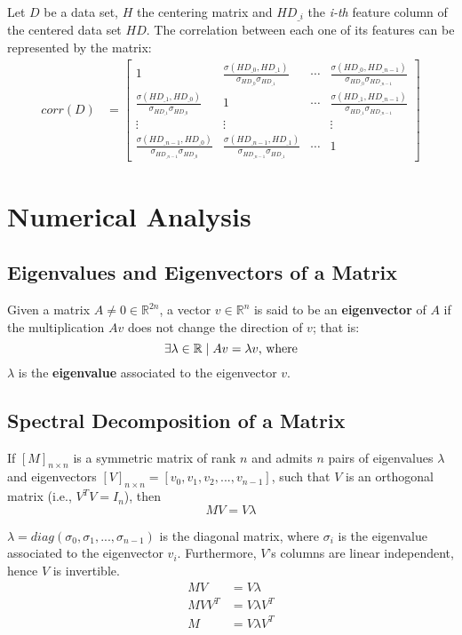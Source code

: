 Let $D$ be a data set, $H$ the centering matrix and $HD_{\_i}$ the {\em i-th} feature column of the centered data set $HD$. The correlation between each one of its features can be represented by the matrix:
\begin{align*}
	corr(D) &= \begin{bmatrix}
		1 & \frac{\sigma(HD_{\_0}, HD_{\_1})}{\sigma_{HD_{\_0}} \sigma_{HD_{\_1}}} & \cdots & \frac{\sigma(HD_{\_0}, HD_{\_n-1})}{\sigma_{HD_{\_0}} \sigma_{HD_{\_n-1}}} \\
		\frac{\sigma(HD_{\_1}, HD_{\_0})}{\sigma_{HD_{\_1}} \sigma_{HD_{\_0}}} & 1 & \cdots & \frac{\sigma(HD_{\_1}, HD_{\_n-1})}{\sigma_{HD_{\_1}} \sigma_{HD_{\_n-1}}} \\
		\vdots & \vdots && \vdots \\
		\frac{\sigma(HD_{\_n-1}, HD_{\_0})}{\sigma_{HD_{\_n-1}} \sigma_{HD_{\_0}}} & \frac{\sigma(HD_{\_n-1}, HD_{\_1})}{\sigma_{HD_{\_n-1}} \sigma_{HD_{\_1}}} & \cdots & 1
	\end{bmatrix}
\end{align*}

\section{Numerical Analysis}
\subsection{Eigenvalues and Eigenvectors of a Matrix}

Given a matrix $A \ne 0 \in \mathbb{R}^{2n}$, a vector $v \in \mathbb{R}^n$ is said to be an \textbf{eigenvector} of $A$ if the multiplication $Av$ does not change the direction of $v$; that is:
$$\exists \lambda \in \mathbb{R} \mid Av = \lambda v \textnormal{, where}$$
$\lambda$ is the \textbf{eigenvalue} associated to the eigenvector $v$.

\subsection{Spectral Decomposition of a Matrix}

If $[M]_{n\times n}$ is a symmetric matrix of rank $n$ and admits $n$ pairs of eigenvalues $\lambda$ and eigenvectors $[V]_{n\times n} = [v_0, v_1, v_2, ..., v_{n-1}]$, such that $V$ is an orthogonal matrix (i.e., $V^TV=I_n$), then
$$MV = V \lambda$$

$\lambda = diag(\sigma_0, \sigma_1, ..., \sigma_{n-1})$ is the diagonal matrix, where $\sigma_i$ is the eigenvalue associated to the eigenvector $v_i$. \cite{cox2001} Furthermore, $V$'s columns are linear independent, hence $V$ is invertible.
\begin{align*}
	MV &= V \lambda \\
	MVV^T &= V \lambda V^T \\
	M &= V \lambda V^T
\end{align*}

